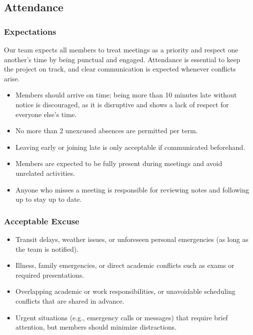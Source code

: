 \documentclass{article}
\begin{document}
\subsection*{Attendance}

\subsubsection*{Expectations}

Our team expects all members to treat meetings as a priority and respect one another’s time by being punctual and engaged. Attendance is essential to keep the project on track, and clear communication is expected whenever conflicts arise.

\begin{itemize}
    \item Members should arrive on time; being more than 10 minutes late without notice is discouraged, as it is disruptive and shows a lack of respect for everyone else’s time.
    \item No more than 2 unexcused absences are permitted per term.
    \item Leaving early or joining late is only acceptable if communicated beforehand.
    \item Members are expected to be fully present during meetings and avoid unrelated activities.
    \item Anyone who misses a meeting is responsible for reviewing notes and following up to stay up to date.
\end{itemize}

\subsubsection*{Acceptable Excuse}

\begin{itemize}
    \item Transit delays, weather issues, or unforeseen personal emergencies (as long as the team is notified).
    \item Illness, family emergencies, or direct academic conflicts such as exams or required presentations.
    \item Overlapping academic or work responsibilities, or unavoidable scheduling conflicts that are shared in advance.
    \item Urgent situations (e.g., emergency calls or messages) that require brief attention, but members should minimize distractions.
\end{itemize}
\end{document}
